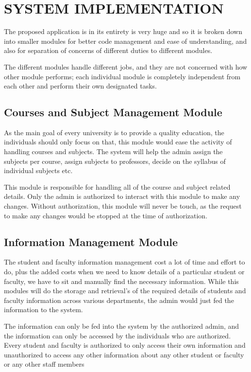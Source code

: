 \section{SYSTEM IMPLEMENTATION}
The proposed application is in its entirety is very huge and so it is broken
down into smaller modules for better code management and ease of understanding,
and also for separation of concerns of different duties to different modules.

The different modules handle different jobs, and they are not concerned with
how other module performs; each individual module is completely independent from
each other and perform their own designated tasks.

\subsection{Courses and Subject Management Module}
As the main goal of every university is to provide a quality education, the
individuals should only focus on that, this module would ease the activity of
handling courses and subjects. The system will help the admin assign the
subjects per course, assign subjects to professors, decide on the syllabus of
individual subjects etc.

This module is responsible for handling all of the
course and subject related details. Only the admin is authorized to interact
with this module to make any changes. Without authorization, this module will
never be touch, as the request to make any changes would be stopped at the time
of authorization.

\subsection{Information Management Module}
The student and faculty information management cost a lot of time and effort to
do, plus the added costs when we need to know details of a particular student or
faculty, we have to sit and manually find the necessary information. While
this modules will do the storage and retrieval’s of the required details of
students and faculty information across various departments, the admin would
just fed the information to the system.

The information can only be fed into the system by the authorized admin, and the
information can only be accessed by the individuals who are authorized. Every
student and faculty is authorized to only access their own information and
unauthorized to access any other information about any other student or faculty
or any other staff members

